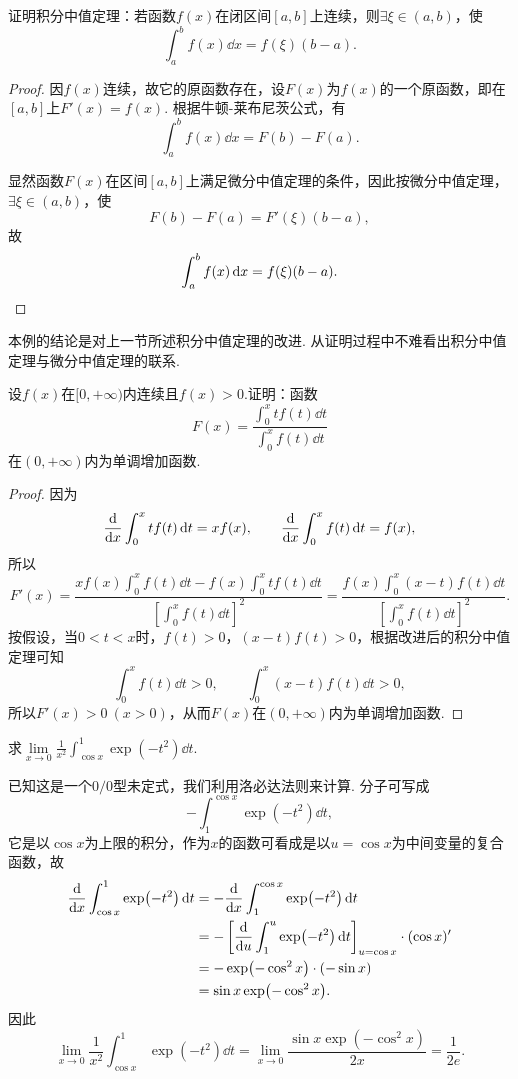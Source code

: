 \begin{example}
证明积分中值定理：若函数\(f(x)\)在闭区间\([a,b]\)上连续，则\(\exists\xi\in(a,b)\)，使\[
\int_a^b f(x) \dd{x} = f(\xi) (b-a).
\]
\begin{proof}
因\(f(x)\)连续，故它的原函数存在，设\(F(x)\)为\(f(x)\)的一个原函数，即在\([a,b]\)上\(F'(x) = f(x)\).
根据牛顿-莱布尼茨公式，有\[
\int_a^b f(x) \dd{x}
= F(b) - F(a).
\]

显然函数\(F(x)\)在区间\([a,b]\)上满足微分中值定理的条件，因此按微分中值定理，\(\exists\xi\in(a,b)\)，使\[
F(b) - F(a) = F'(\xi) (b-a),
\]故\[
\int_a^b f(x) \dd{x} = f(\xi) (b-a).
\qedhere
\]
\end{proof}
\end{example}
本例的结论是对上一节所述积分中值定理的改进.
从证明过程中不难看出积分中值定理与微分中值定理的联系.

\begin{example}
\def\fu{\displaystyle \int_0^x t f(t) \dd{t}}
\def\fv{\displaystyle \int_0^x f(t) \dd{t}}
\def\fvv{\left[ \fv \right]^2}
\def\fw{\displaystyle \int_0^x (x-t) f(t) \dd{t}}
设\(f(x)\)在\([0,+\infty)\)内连续且\(f(x) > 0\).证明：函数\[
F(x) = \frac{\fu}{\fv}
\]在\((0,+\infty)\)内为单调增加函数.
\begin{proof}
因为\[
\dv{x} \fu = x f(x),
\qquad
\dv{x} \fv = f(x),
\]所以\[
F'(x) = \frac{x f(x) \fv - f(x) \fu}{\fvv}
= \frac{f(x) \fw}{\fvv}.
\]按假设，当\(0 < t < x\)时，\(f(t) > 0\)，\((x-t) f(t) > 0\)，根据改进后的积分中值定理可知\[
\fv > 0, \qquad \fw > 0,
\]所以\(F'(x) > 0\ (x > 0)\)，从而\(F(x)\)在\((0,+\infty)\)内为单调增加函数.
\end{proof}
\end{example}

\begin{example}
求\(\lim\limits_{x\to0} \frac{1}{x^2} \int_{\cos x}^1 \exp(-t^2) \dd{t}\).
\begin{solution}
已知这是一个\(0/0\)型未定式，我们利用洛必达法则来计算.
分子可写成\[
- \int_1^{\cos x} \exp(-t^2) \dd{t},
\]它是以\(\cos x\)为上限的积分，作为\(x\)的函数可看成是以\(u = \cos x\)为中间变量的复合函数，故\begin{align*}
\dv{x} \int_{\cos x}^1 \exp(-t^2) \dd{t}
&= -\dv{x} \int_1^{\cos x} \exp(-t^2) \dd{t} \\
&= -\left[ \dv{u}\int_1^u \exp(-t^2) \dd{t} \right]_{u=\cos x} \cdot (\cos x)' \\
&= -\exp(-\cos^2 x) \cdot (-\sin x) \\
&= \sin x \exp(-\cos^2 x).
\end{align*}
因此\[
\lim\limits_{x\to0} \frac{1}{x^2} \int_{\cos x}^1 \exp(-t^2) \dd{t}
= \lim\limits_{x\to0} \frac{\sin x \exp(-\cos^2 x)}{2x}
= \frac{1}{2e}.
\]
\end{solution}
\end{example}


